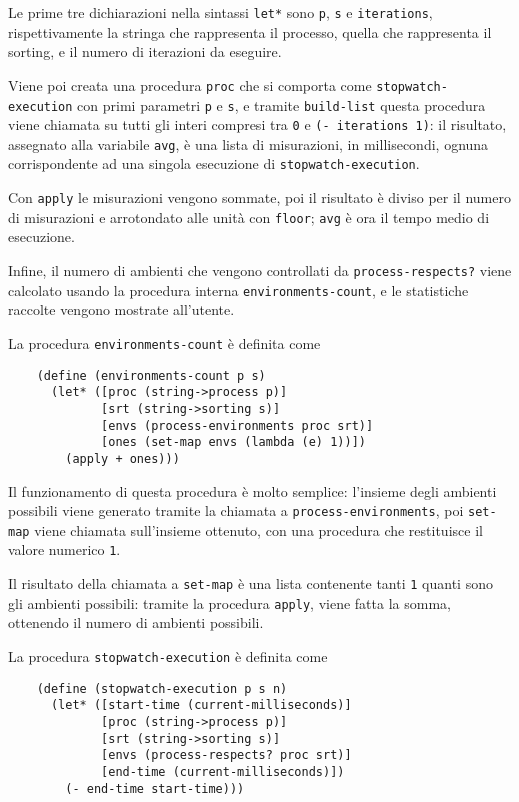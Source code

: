 Le prime tre dichiarazioni nella sintassi \lstinline{let*} sono
\lstinline{p}, \lstinline{s} e \lstinline{iterations}, rispettivamente
la stringa che rappresenta il processo, quella che rappresenta il
sorting, e il numero di iterazioni da eseguire.

Viene poi creata una procedura \lstinline{proc} che si comporta come
\lstinline{stopwatch-execution} con primi parametri \lstinline{p} e
\lstinline{s}, e tramite \lstinline{build-list} questa procedura
viene chiamata su tutti gli interi compresi tra \lstinline{0} e
\lstinline{(- iterations 1)}: il risultato, assegnato alla variabile
\lstinline{avg}, \`e una lista di misurazioni, in millisecondi, ognuna
corrispondente ad una singola esecuzione di
\lstinline{stopwatch-execution}.

Con \lstinline{apply} le misurazioni vengono sommate, poi il risultato
\`e diviso per il numero di misurazioni e arrotondato alle unit\`a
con \lstinline{floor}; \lstinline{avg} \`e ora il tempo medio di
esecuzione.

Infine, il numero di ambienti che vengono controllati da
\lstinline{process-respects?} viene calcolato usando la procedura
interna \lstinline{environments-count}, e le statistiche raccolte
vengono mostrate all'utente.

La procedura \lstinline{environments-count} \`e definita come

\begin{lstlisting}
    (define (environments-count p s)
      (let* ([proc (string->process p)]
             [srt (string->sorting s)]
             [envs (process-environments proc srt)]
             [ones (set-map envs (lambda (e) 1))])
        (apply + ones)))
\end{lstlisting}

Il funzionamento di questa procedura \`e molto semplice: l'insieme degli
ambienti possibili viene generato tramite la chiamata a
\lstinline{process-environments}, poi \lstinline{set-map} viene
chiamata sull'insieme ottenuto, con una procedura che restituisce il
valore numerico \lstinline{1}.

Il risultato della chiamata a \lstinline{set-map} \`e una lista
contenente tanti \lstinline{1} quanti sono gli ambienti possibili:
tramite la procedura \lstinline{apply}, viene fatta la somma, ottenendo
il numero di ambienti possibili.

La procedura \lstinline{stopwatch-execution} \`e definita come

\begin{lstlisting}
    (define (stopwatch-execution p s n)
      (let* ([start-time (current-milliseconds)]
             [proc (string->process p)]
             [srt (string->sorting s)]
             [envs (process-respects? proc srt)]
             [end-time (current-milliseconds)])
        (- end-time start-time)))
\end{lstlisting}

